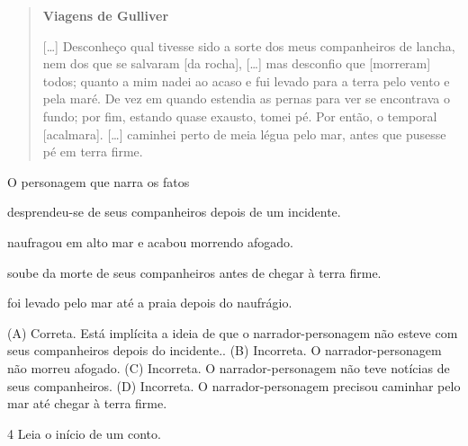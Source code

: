 \begin{quote}
\textbf{Viagens de Gulliver}

{[}\ldots{}{]} Desconheço qual tivesse sido a sorte dos meus
companheiros de lancha, nem dos que se salvaram [da rocha],
{[}\ldots{}{]} mas desconfio que [morreram] todos; quanto a mim nadei ao
acaso e fui levado para a terra pelo vento e pela maré. De vez em quando
estendia as pernas para ver se encontrava o fundo; por fim, estando
quase exausto, tomei pé. Por então, o temporal [acalmara]. {[}\ldots{}{]}
caminhei perto de meia légua pelo mar, antes que pusesse pé em terra
firme.

\end{quote}

O personagem que narra os fatos

\begin{escolha}
\item desprendeu-se de seus companheiros depois de um incidente.

\item naufragou em alto mar e acabou morrendo afogado.

\item soube da morte de seus companheiros antes de chegar à terra firme.

\item foi levado pelo mar até a praia depois do naufrágio.
\end{escolha}


(A) Correta. Está implícita a ideia de que o narrador-personagem não esteve com seus companheiros depois do incidente..
(B) Incorreta. O narrador-personagem não morreu afogado.
(C) Incorreta. O narrador-personagem não teve notícias de seus companheiros.
(D) Incorreta. O narrador-personagem precisou caminhar pelo mar até chegar à terra firme.

\num{4} Leia o início de um conto.

